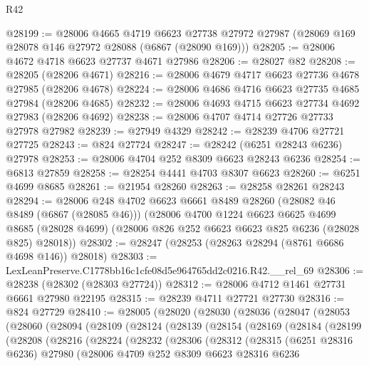 \begin{lexlean}{R42}
\begin{coremodule}
{@28199 := @28006
    @4665
    @4719
    @6623
    @27738
    @27972
    @27987
    (@28069 @169 @28078 @146 @27972 @28088 (@6867 (@28090 @169)))
@28205 := @28006 @4672 @4718 @6623 @27737 @4671 @27986
@28206 := @28027 @82
@28208 := @28205 (@28206 @4671)
@28216 := @28006 @4679 @4717 @6623 @27736 @4678 @27985 (@28206 @4678)
@28224 := @28006 @4686 @4716 @6623 @27735 @4685 @27984 (@28206 @4685)
@28232 := @28006 @4693 @4715 @6623 @27734 @4692 @27983 (@28206 @4692)
@28238 := @28006 @4707 @4714 @27726 @27733 @27978 @27982
@28239 := @27949 @4329
@28242 := @28239 @4706 @27721 @27725
@28243 := @824 @27724
@28247 := @28242 (@6251 @28243 @6236) @27978
@28253 := @28006 @4704 @252 @8309 @6623 @28243 @6236
@28254 := @6813 @27859
@28258 := @28254 @4441 @4703 @8307 @6623
@28260 := @6251 @4699 @8685
@28261 := @21954 @28260
@28263 := @28258 @28261 @28243
@28294 := @28006
    @248
    @4702
    @6623
    @6661
    @8489
    @28260
    (@28082 @46 @8489 (@6867 (@28085 @46)))
    (@28006
      @4700
      @1224
      @6623
      @6625
      @4699
      @8685
      (@28028 @4699)
      (@28006 @826 @252 @6623 @6623 @825 @6236 (@28028 @825) @28018))
@28302 := @28247 (@28253 (@28263 @28294 (@8761 @6686 @4698 @146)) @28018)
@28303 := LexLeanPreserve.C1778bb16c1cfe08d5e964765dd2c0216.R42.__rel_69
@28306 := @28238 (@28302 (@28303 @27724))
@28312 := @28006 @4712 @1461 @27731 @6661 @27980 @22195
@28315 := @28239 @4711 @27721 @27730
@28316 := @824 @27729
@28410 := @28005
    (@28020
      (@28030
        (@28036
          (@28047
            (@28053
              (@28060
                (@28094
                  (@28109
                    (@28124
                      (@28139
                        (@28154
                          (@28169
                            (@28184
                              (@28199
                                (@28208
                                  (@28216
                                    (@28224
                                      (@28232
                                        (@28306
                                          (@28312
                                            (@28315
                                              (@6251 @28316 @6236)
                                              @27980
                                              (@28006
                                                @4709
                                                @252
                                                @8309
                                                @6623
                                                @28316
                                                @6236
}
\end{coremodule}
\end{lexlean}
